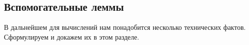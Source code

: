 \documentclass[../../paper.tex]{subfiles}
\begin{document}
\subsection{Вспомогательные леммы}
В дальнейшем для вычислений нам понадобится несколько технических фактов. Сформулируем и докажем их в этом разделе.

%

%

%

%
%
%

%

%

\end{document}
